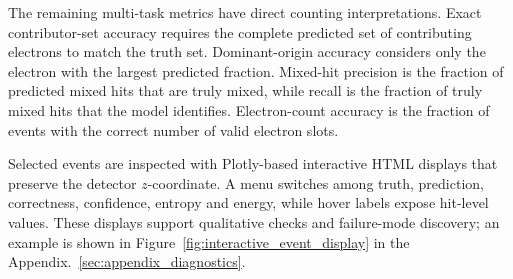 The remaining multi-task metrics have direct counting interpretations. Exact
contributor-set accuracy requires the complete predicted set of contributing
electrons to match the truth set. Dominant-origin accuracy considers only the
electron with the largest predicted fraction. Mixed-hit precision is the
fraction of predicted mixed hits that are truly mixed, while recall is the
fraction of truly mixed hits that the model identifies. Electron-count
accuracy is the fraction of events with the correct number of valid electron
slots.

Selected events are inspected with Plotly-based interactive HTML displays that
preserve the detector \(z\)-coordinate. A menu switches among truth,
prediction, correctness, confidence, entropy and energy, while hover labels
expose hit-level values. These displays support qualitative checks and
failure-mode discovery; an example is shown in
Figure~\ref{fig:interactive_event_display} in the Appendix.~\ref{sec:appendix_diagnostics}.
